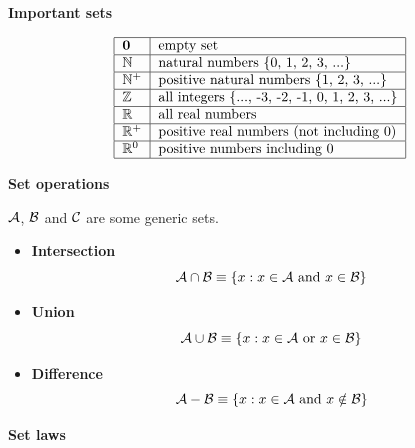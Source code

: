\documentclass[justified, sixbynine]{tufte-book}
\def\subsubsection#1{{\bf #1}}
\theoremstyle{plain}%
\newtheorem * {corollary}{Corollary}
\theoremstyle{definition}
\theoremstyle{remark}
\newtheorem * {remark}{Remark}
\newtheorem * {note}{Note}
\begin{document}
\begin{fullwidth}
\subsubsection{Important sets}

\begin{equation}
\begin{tabular}{|l|l|}
\hline
${\bf 0}$ & empty set \\ \hline
$\mathbb{N}$ & natural numbers \{0, 1, 2, 3, ...\} \\ \hline
$\mathbb{N}^{+}$ & positive natural numbers \{1, 2, 3, ...\} \\ \hline
$\mathbb{Z}$ & all integers \{..., -3, -2, -1, 0, 1, 2, 3, ...\} \\ \hline
$\mathbb{R}$ & all real numbers \\ \hline
$\mathbb{R}^{+}$ & positive real numbers (not including 0) \\ \hline
$\mathbb{R}^{0}$ & positive numbers including 0 \\ \hline
\end{tabular}
\end{equation}

\subsubsection{Set operations}

${\cal A}$, ${\cal B}$ and ${\cal C}$ are some generic sets.

\begin{itemize}
\item  {\bf Intersection}
\begin{equation}
{\cal A}\cap {\cal B}\equiv \{x:x\in {\cal A}\text{ and }x\in
{\cal B}\}
\end{equation}

\item  {\bf Union}
\begin{equation}
{\cal A}\cup {\cal B}\equiv \{x:x\in {\cal A}\text{ or }x\in {\cal %
B}\}
\end{equation}

\item  {\bf Difference}
\begin{equation}
{\cal A}-{\cal B}\equiv \{x:x\in {\cal A}\text{ and }x\notin {\cal %
B}\}
\end{equation}
\end{itemize}

\subsubsection{Set laws}


\end{fullwidth}
\end{document}
